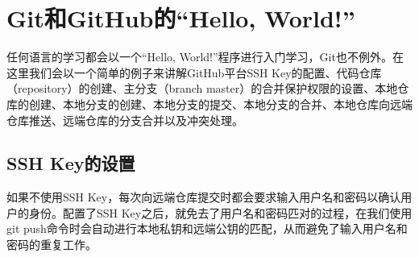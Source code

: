 \documentclass[a4paper,14pt]{article}
\begin{document}
\newpage

\quad

\quad

\quad

\section{Git和GitHub的“Hello, World!”}
任何语言的学习都会以一个“Hello, World!”程序进行入门学习，Git也不例外。在这里我们会以一个简单的例子来讲解GitHub平台SSH Key的配置、代码仓库（repository）的创建、主分支（branch master）的合并保护权限的设置、本地仓库的创建、本地分支的创建、本地分支的提交、本地分支的合并、本地仓库向远端仓库推送、远端仓库的分支合并以及冲突处理。

\quad

\subsection*{SSH Key的设置}
如果不使用SSH Key，每次向远端仓库提交时都会要求输入用户名和密码以确认用户的身份。配置了SSH Key之后，就免去了用户名和密码匹对的过程，在我们使用git push命令时会自动进行本地私钥和远端公钥的匹配，从而避免了输入用户名和密码的重复工作。
\end{document}
